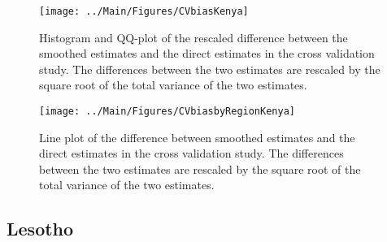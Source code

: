\documentclass[12pt]{article}\usepackage[]{graphicx}\usepackage[]{color}
\newenvironment{knitrout}{}{} %
\begin{document}
\begin{knitrout}
\color{fgcolor}\begin{figure}[bht]

{\centering \texttt{[image: ../Main/Figures/CVbiasKenya]} 

}

\caption[Histogram and QQ-plot of the rescaled difference between the smoothed estimates and the direct estimates in the cross validation study]{Histogram and QQ-plot of the rescaled difference between the smoothed estimates and the direct estimates in the cross validation study. The differences between the two estimates are rescaled by the square root of the total variance of the two estimates.}\label{fig:unnamed-chunk-169}
\end{figure}


\end{knitrout}

\begin{knitrout}
\color{fgcolor}\begin{figure}[bht]

{\centering \texttt{[image: ../Main/Figures/CVbiasbyRegionKenya]} 

}

\caption[Line plot of the difference between smoothed estimates and the direct estimates in the cross validation study]{Line plot of the difference between smoothed estimates and the direct estimates in the cross validation study. The differences between the two estimates are rescaled by the square root of the total variance of the two estimates.}\label{fig:unnamed-chunk-170}
\end{figure}


\end{knitrout}


\clearpage
\subsection{Lesotho}


\end{document}
